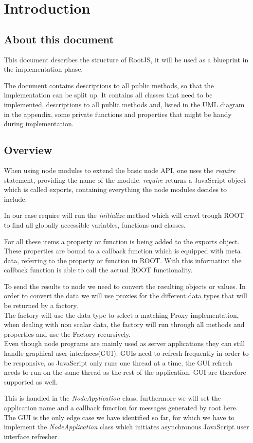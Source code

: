 \chapter{Introduction}
\section{About this document}
This document describes the structure of RootJS, it will be used as a blueprint in the implementation phase.

The document contains descriptions to all public methods, so that the implementation can be split up. It contains all classes that need to be implemented, descriptions to all public methods and, listed in the UML diagram in the appendix, some private functions and properties that might be handy during implementation.

\section{Overview}
When using node modules to extend the basic node API, one uses the \textit{require} statement, providing the name of the module.
\textit{require} returns a JavaScript object which is called exports, containing everything the node modules decides to include.

In our case require will run the \textit{initialize} method which will crawl trough ROOT to find all globally accessible variables, functions and classes.

For all these items a property or function is being added to the exports object.
These properties are bound to a callback function which is equipped with meta data, referring to the property or function in ROOT.
With this information the callback function is able to call the actual ROOT functionality.

To send the results to node we need to convert the resulting objects or values.
In order to convert the data we will use proxies for the different data types that will be returned by a factory.\\

The factory will use the data type to select a matching Proxy implementation, when dealing with non scalar data, the factory will run through all methods and properties and use the Factory recursively.\\

Even though node programs are mainly used as server applications they can still handle graphical user interfaces(GUI).
GUIs need to refresh frequently in order to be responsive, as JavaScript only runs one thread at a time, the GUI refresh needs to run on the same thread as the rest of the application. GUI are therefore supported as well. 

This is handled in the \textit{NodeApplication} class, furthermore we will set the application name and a callback function for messages generated by root here. The GUI is the only edge case we have identified so far, for which we have to implement the \textit{NodeApplication} class which initiates asynchronous JavaScript user interface refresher. 
